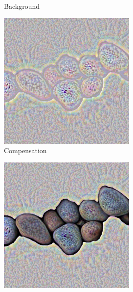 \begin{figure}[]
\begin{subfigure}{\textwidth}
\begin{subfigure}{0.24\textwidth}
            \caption{Background}
            \label{fig:ex01-pebbles-5steps-some_bg}
        \end{subfigure}
        \hfill
        \begin{subfigure}{0.24\textwidth}
            \centering
            \includegraphics[width=\textwidth]{images/04-experiment01/pebbles/5/some_im.jpg}
            \caption{Compensation}
            \label{fig:ex01-pebbles-5steps-some_im}
        \end{subfigure}
        \hfill
        \begin{subfigure}{0.24\textwidth}
            \centering
            \includegraphics[width=\textwidth]{images/04-experiment01/pebbles/5/some_proj.jpg}

\end{subfigure}
\end{subfigure}
\end{figure}
